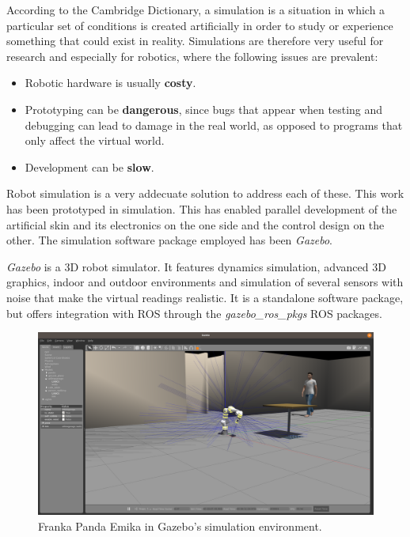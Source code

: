 According to the Cambridge Dictionary, a simulation is a situation in which a particular set of conditions is created artificially in order to study or experience something that could exist in reality. Simulations are therefore very useful for research and especially for robotics, where the following issues are prevalent:

\begin{itemize}
    \item Robotic hardware is usually \textbf{costy}.
    \item Prototyping can be \textbf{dangerous}, since bugs that appear when testing and debugging can lead to damage in the real world, as opposed to programs that only affect the virtual world.
    \item Development can be \textbf{slow}.
\end{itemize}

Robot simulation is a very addecuate solution to address each of these. This work has been prototyped in simulation. This has enabled parallel development of the artificial skin and its electronics on the one side and the control design on the other. The simulation software package employed has been \textit{Gazebo}.

\textit{Gazebo} \cite{gazebo} is a 3D robot simulator. It features dynamics simulation,  advanced 3D graphics, indoor and outdoor environments and simulation of several sensors with noise that make the virtual readings realistic. It is a standalone software package, but offers integration with ROS through the \textit{gazebo\_ros\_pkgs} ROS packages.

\begin{figure}[H]
    \caption[Gazebo]{
        Franka Panda Emika in Gazebo's simulation environment.
    }
    \centering
    \includegraphics[width=\textwidth]{figs/gazebo_intro.png}
\end{figure}

